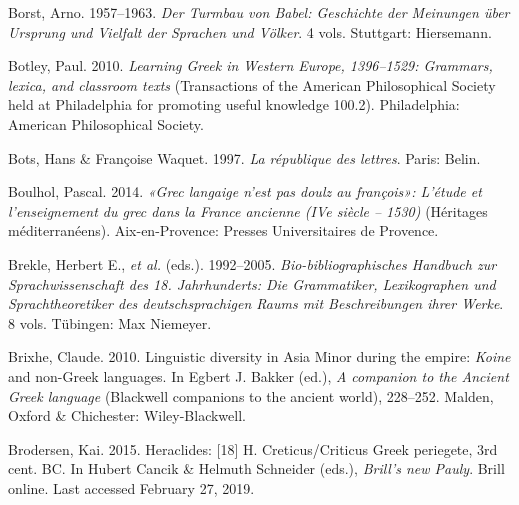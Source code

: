 \begin{styleStandard}
Borst, Arno. 1957–1963. \textit{Der Turmbau von Babel: Geschichte der Meinungen über Ursprung und Vielfalt der Sprachen und Völker}. 4 vols. Stuttgart: Hiersemann.
\end{styleStandard}

\begin{styleStandard}
Botley, Paul. 2010. \textit{Learning Greek in Western Europe, 1396–1529: Grammars, lexica, and classroom texts} (Transactions of the American Philosophical Society held at Philadelphia for promoting useful knowledge 100.2). Philadelphia: American Philosophical Society.
\end{styleStandard}

\begin{styleStandard}
Bots, Hans \& Françoise Waquet. 1997. \textit{La république des lettres}. Paris: Belin.
\end{styleStandard}

\begin{styleStandard}
Boulhol, Pascal. 2014. \textit{«Grec langaige n’est pas doulz au françois»: L’étude et l’enseignement du grec dans la France ancienne (IVe siècle – 1530)} (Héritages méditerranéens). Aix-en-Provence: Presses Universitaires de Provence.
\end{styleStandard}

\begin{styleStandard}
Brekle, Herbert E., \textit{et al.} (eds.). 1992–2005. \textit{Bio-bibliographisches Handbuch zur Sprachwissenschaft des 18. Jahrhunderts: Die Grammatiker, Lexikographen und Sprachtheoretiker des deutschsprachigen Raums mit Beschreibungen ihrer Werke}. 8 vols. Tübingen: Max Niemeyer.
\end{styleStandard}

\begin{styleStandard}
Brixhe, Claude. 2010. Linguistic diversity in Asia Minor during the empire: \textit{Koine} and non-Greek languages. In Egbert J. Bakker (ed.), \textit{A companion to the Ancient Greek language} (Blackwell companions to the ancient world), 228–252. Malden, Oxford \& Chichester: Wiley-Blackwell.
\end{styleStandard}

\begin{styleStandard}
Brodersen, Kai. 2015. Heraclides: [18] H. Creticus/Criticus Greek periegete, 3rd cent. BC. In Hubert Cancik \& Helmuth Schneider (eds.), \textit{Brill’s new Pauly}. Brill online. Last accessed February 27, 2019.
\end{styleStandard}

